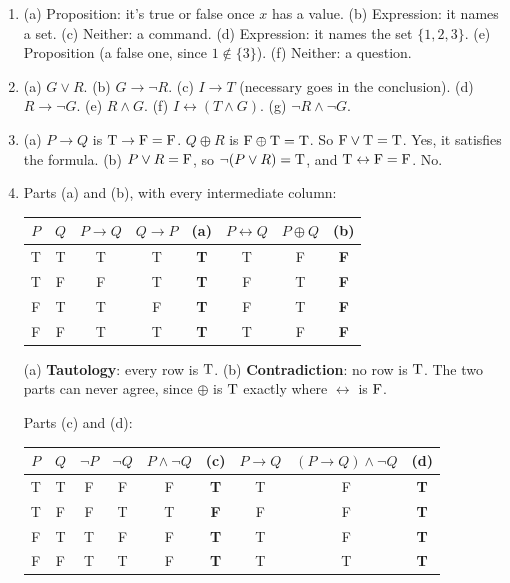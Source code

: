 \begin{enumerate}[label=\textbf{\arabic*.},leftmargin=1.8em,itemsep=0.45em]
  \item (a) Proposition: it's true or false once $x$ has a value. (b) Expression: it names a set. (c) Neither: a command. (d) Expression: it names the set $\{1,2,3\}$. (e) Proposition (a false one, since $1\notin\{3\}$). (f) Neither: a question.
  \item (a) $G\lor R$. (b) $G\to\lnot R$. (c) $I\to T$ (necessary goes in the conclusion). (d) $R\to\lnot G$. (e) $R\land G$. (f) $I\leftrightarrow(T\land G)$. (g) $\lnot R\land\lnot G$.
  \item (a) $P\to Q$ is $\mathrm{T}\to\mathrm{F}=\mathrm{F}$. $Q\oplus R$ is $\mathrm{F}\oplus\mathrm{T}=\mathrm{T}$. So $\mathrm{F}\lor\mathrm{T}=\mathrm{T}$. Yes, it satisfies the formula.
  (b) $P\lor R=\mathrm{F}$, so $\lnot(P\lor R)=\mathrm{T}$, and $\mathrm{T}\leftrightarrow\mathrm{F}=\mathrm{F}$. No.
  \item Parts (a) and (b), with every intermediate column:

  \smallskip\begin{tabular}{cc|cc>{\bfseries}c|cc>{\bfseries}c}
  \toprule
  $P$ & $Q$ & $P\to Q$ & $Q\to P$ & (a) & $P\leftrightarrow Q$ & $P\oplus Q$ & (b)\\
  \midrule
  T & T & T & T & T & T & F & F\\
  T & F & F & T & T & F & T & F\\
  F & T & T & F & T & F & T & F\\
  F & F & T & T & T & T & F & F\\
  \bottomrule
  \end{tabular}\par\smallskip

  (a) \textbf{Tautology}: every row is $\mathrm{T}$. (b) \textbf{Contradiction}: no row is $\mathrm{T}$. The two parts can never agree, since $\oplus$ is $\mathrm{T}$ exactly where $\leftrightarrow$ is $\mathrm{F}$.

  Parts (c) and (d):

  \smallskip\begin{tabular}{cc|ccc>{\bfseries}c|cc>{\bfseries}c}
  \toprule
  $P$ & $Q$ & $\lnot P$ & $\lnot Q$ & $P\land\lnot Q$ & (c) & $P\to Q$ & $(P\to Q)\land\lnot Q$ & (d)\\
  \midrule
  T & T & F & F & F & T & T & F & T\\
  T & F & F & T & T & F & F & F & T\\
  F & T & T & F & F & T & T & F & T\\
  F & F & T & T & F & T & T & T & T\\
  \bottomrule
  \end{tabular}\par\smallskip


\end{enumerate}
